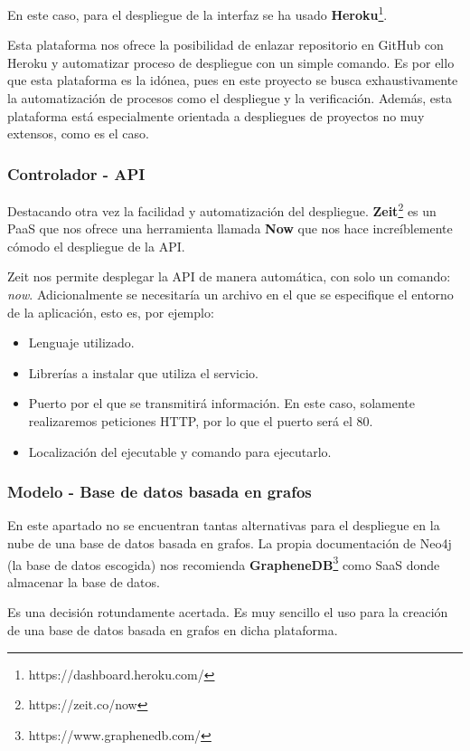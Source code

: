 En este caso, para  el despliegue de la interfaz se ha usado \textbf{Heroku}\footnote{https://dashboard.heroku.com/}.

Esta plataforma nos ofrece la posibilidad de enlazar  repositorio en GitHub con Heroku y automatizar proceso de despliegue con un simple comando. Es por ello que esta plataforma es la idónea, pues en este proyecto se busca exhaustivamente la automatización de procesos como el despliegue y la verificación. Además, esta plataforma está especialmente orientada a despliegues de proyectos no muy extensos, como es el caso.\cite{herokuvs}

\subsubsection{Controlador - API}

Destacando otra vez la facilidad y automatización del despliegue. \textbf{Zeit}\footnote{https://zeit.co/now} es un PaaS que nos ofrece una herramienta llamada \textbf{Now} que nos hace increíblemente cómodo el despliegue de la API.

Zeit nos permite desplegar la API de manera automática, con solo un comando: \textit{now}. Adicionalmente se necesitaría un archivo en el que se especifique el entorno de la aplicación, esto es, por ejemplo:

\begin{itemize}
    \item Lenguaje utilizado.
    \item Librerías a instalar que utiliza el servicio.
    \item Puerto por el que se transmitirá información. En este caso, solamente realizaremos peticiones HTTP, por lo que el puerto será el 80.
    \item Localización del ejecutable y comando para ejecutarlo.
\end{itemize}

\subsubsection{Modelo - Base de datos basada en grafos}

En este apartado no se encuentran tantas alternativas para el despliegue en la nube de una base de datos basada en grafos. La propia documentación de Neo4j (la base de datos escogida) nos recomienda \textbf{GrapheneDB}\footnote{https://www.graphenedb.com/} como SaaS donde almacenar la base de datos.

Es una decisión rotundamente acertada. Es muy sencillo el uso para la creación de una base de datos basada en grafos en dicha plataforma.